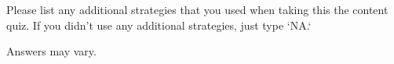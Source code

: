 \documentclass{ximera}
\begin{document}
\begin{problem}
    Please list any additional strategies that you used when taking this the content quiz. If you didn't use any additional strategies, just type `NA.`
   \begin{freeResponse}
   Answers may vary.
   \end{freeResponse}
\end{problem}



%
\end{document}
